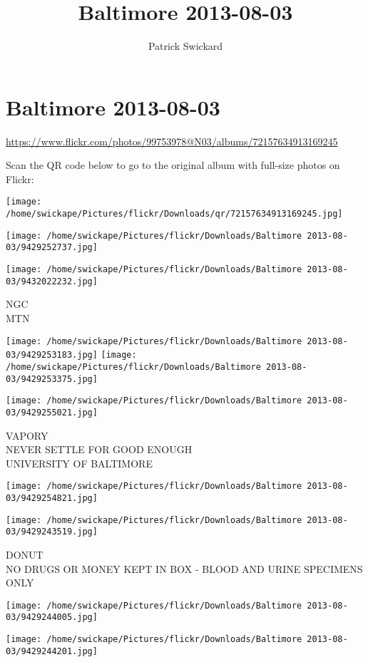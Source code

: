 \documentclass[10pt,letterpaper]{article}
\title{Baltimore 2013-08-03}
\author{Patrick Swickard}
\date{}
\begin{document}
\section*{Baltimore 2013-08-03}

\url{https://www.flickr.com/photos/99753978@N03/albums/72157634913169245}

Scan the QR code below to go to the original album with full-size photos on Flickr:

\texttt{[image: /home/swickape/Pictures/flickr/Downloads/qr/72157634913169245.jpg]}
\pagebreak

\texttt{[image: /home/swickape/Pictures/flickr/Downloads/Baltimore 2013-08-03/9429252737.jpg]}

\vspace{0.25in}
\texttt{[image: /home/swickape/Pictures/flickr/Downloads/Baltimore 2013-08-03/9432022232.jpg]}

NGC\\
MTN
\pagebreak

\texttt{[image: /home/swickape/Pictures/flickr/Downloads/Baltimore 2013-08-03/9429253183.jpg]}
\texttt{[image: /home/swickape/Pictures/flickr/Downloads/Baltimore 2013-08-03/9429253375.jpg]}

\vspace{0.25in}
\texttt{[image: /home/swickape/Pictures/flickr/Downloads/Baltimore 2013-08-03/9429255021.jpg]}

VAPORY\\
NEVER SETTLE FOR GOOD ENOUGH\\
UNIVERSITY OF BALTIMORE
\pagebreak

\texttt{[image: /home/swickape/Pictures/flickr/Downloads/Baltimore 2013-08-03/9429254821.jpg]}

\vspace{0.25in}
\texttt{[image: /home/swickape/Pictures/flickr/Downloads/Baltimore 2013-08-03/9429243519.jpg]}

DONUT\\
NO DRUGS OR MONEY KEPT IN BOX {-} BLOOD AND URINE SPECIMENS ONLY
\pagebreak

\texttt{[image: /home/swickape/Pictures/flickr/Downloads/Baltimore 2013-08-03/9429244005.jpg]}

\vspace{0.25in}
\texttt{[image: /home/swickape/Pictures/flickr/Downloads/Baltimore 2013-08-03/9429244201.jpg]}
\end{document}
